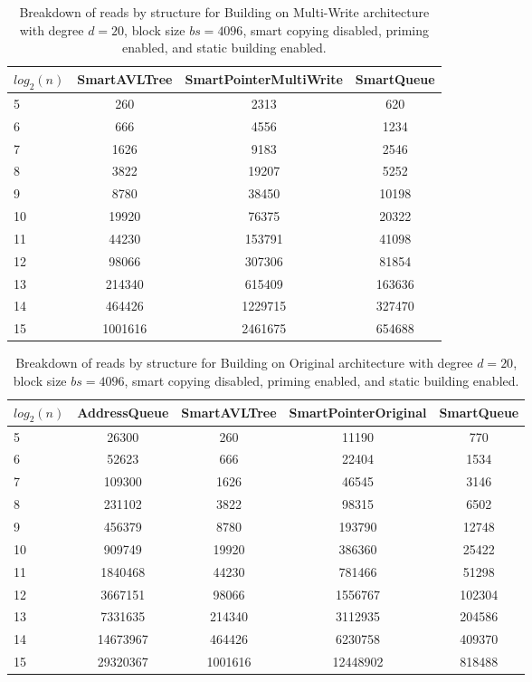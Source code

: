 \begin{table}[]
\centering
\begin{tabular}{|l|c|c|c|}
$log_2(n)$ & SmartAVLTree & SmartPointerMultiWrite & SmartQueue \\ \hline
5 & 260 & 2313 & 620 \\ \hline
6 & 666 & 4556 & 1234 \\ \hline
7 & 1626 & 9183 & 2546 \\ \hline
8 & 3822 & 19207 & 5252 \\ \hline
9 & 8780 & 38450 & 10198 \\ \hline
10 & 19920 & 76375 & 20322 \\ \hline
11 & 44230 & 153791 & 41098 \\ \hline
12 & 98066 & 307306 & 81854 \\ \hline
13 & 214340 & 615409 & 163636 \\ \hline
14 & 464426 & 1229715 & 327470 \\ \hline
15 & 1001616 & 2461675 & 654688 \\ \hline
\end{tabular}
\caption{Breakdown of reads by structure for Building on Multi-Write architecture with degree $d=20$, block size $bs=4096$, smart copying disabled, priming enabled, and static building enabled.}
    \label{tab:reads_by_structure_build_d20_bs4096_copiesfalse_primetrue_staticinsertiontrue_ptmultiwrite_movetrue}
\end{table}

\begin{table}[]
\centering
\begin{tabular}{|l|c|c|c|c|}
$log_2(n)$ & AddressQueue & SmartAVLTree & SmartPointerOriginal & SmartQueue \\ \hline
5 & 26300 & 260 & 11190 & 770 \\ \hline
6 & 52623 & 666 & 22404 & 1534 \\ \hline
7 & 109300 & 1626 & 46545 & 3146 \\ \hline
8 & 231102 & 3822 & 98315 & 6502 \\ \hline
9 & 456379 & 8780 & 193790 & 12748 \\ \hline
10 & 909749 & 19920 & 386360 & 25422 \\ \hline
11 & 1840468 & 44230 & 781466 & 51298 \\ \hline
12 & 3667151 & 98066 & 1556767 & 102304 \\ \hline
13 & 7331635 & 214340 & 3112935 & 204586 \\ \hline
14 & 14673967 & 464426 & 6230758 & 409370 \\ \hline
15 & 29320367 & 1001616 & 12448902 & 818488 \\ \hline
\end{tabular}
\caption{Breakdown of reads by structure for Building on Original architecture with degree $d=20$, block size $bs=4096$, smart copying disabled, priming enabled, and static building enabled.}
    \label{tab:reads_by_structure_build_d20_bs4096_copiesfalse_primetrue_staticinsertiontrue_ptoriginal_movefalse}
\end{table}

